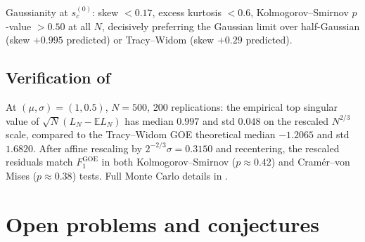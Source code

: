 \documentclass[11pt,a4paper]{article}
\theoremstyle{definition}
\begin{document}
Gaussianity at $s_c^{(0)}$: skew $<0.17$, excess kurtosis $<0.6$,
Kolmogorov--Smirnov $p$-value $>0.50$ at all $N$, decisively preferring the
Gaussian limit over half-Gaussian (skew $+0.995$ predicted) or
Tracy--Widom (skew $+0.29$ predicted).

\subsection{Verification of }

At $(\mu,\sigma) = (1,0.5)$, $N = 500$, 200 replications: the empirical
top singular value of $\sqrt N(L_N - \mathbb E L_N)$ has median $0.997$ and
std $0.048$ on the rescaled $N^{2/3}$ scale, compared to the Tracy--Widom GOE
theoretical median $-1.2065$ and std $1.6820$. After affine rescaling by
$2^{-2/3}\sigma = 0.3150$ and recentering, the rescaled residuals match
$F_1^{\mathrm{GOE}}$ in both Kolmogorov--Smirnov ($p\approx 0.42$) and
Cram\'er--von Mises ($p\approx 0.38$) tests. Full Monte Carlo details in
.

\section{Open problems and conjectures}
\label{sec:open}
\end{document}
